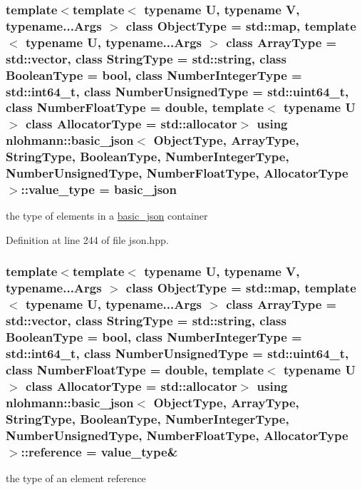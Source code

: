\subsubsection[{value\+\_\+type}]{\setlength{\rightskip}{0pt plus 5cm}template$<$template$<$ typename U, typename V, typename...\+Args $>$ class Object\+Type = std\+::map, template$<$ typename U, typename...\+Args $>$ class Array\+Type = std\+::vector, class String\+Type  = std\+::string, class Boolean\+Type  = bool, class Number\+Integer\+Type  = std\+::int64\+\_\+t, class Number\+Unsigned\+Type  = std\+::uint64\+\_\+t, class Number\+Float\+Type  = double, template$<$ typename U $>$ class Allocator\+Type = std\+::allocator$>$ using {\bf nlohmann\+::basic\+\_\+json}$<$ Object\+Type, Array\+Type, String\+Type, Boolean\+Type, Number\+Integer\+Type, Number\+Unsigned\+Type, Number\+Float\+Type, Allocator\+Type $>$\+::{\bf value\+\_\+type} =  {\bf basic\+\_\+json}}\label{classnlohmann_1_1basic__json_ac8d45b57874b4a6e9c07f7d3b5daa1f9}


the type of elements in a \hyperlink{classnlohmann_1_1basic__json}{basic\+\_\+json} container 



Definition at line 244 of file json.\+hpp.

\hypertarget{classnlohmann_1_1basic__json_a3ec8e17be8732fe436e9d6733f52b7a3}{}
\subsubsection[{reference}]{\setlength{\rightskip}{0pt plus 5cm}template$<$template$<$ typename U, typename V, typename...\+Args $>$ class Object\+Type = std\+::map, template$<$ typename U, typename...\+Args $>$ class Array\+Type = std\+::vector, class String\+Type  = std\+::string, class Boolean\+Type  = bool, class Number\+Integer\+Type  = std\+::int64\+\_\+t, class Number\+Unsigned\+Type  = std\+::uint64\+\_\+t, class Number\+Float\+Type  = double, template$<$ typename U $>$ class Allocator\+Type = std\+::allocator$>$ using {\bf nlohmann\+::basic\+\_\+json}$<$ Object\+Type, Array\+Type, String\+Type, Boolean\+Type, Number\+Integer\+Type, Number\+Unsigned\+Type, Number\+Float\+Type, Allocator\+Type $>$\+::{\bf reference} =  {\bf value\+\_\+type}\&}\label{classnlohmann_1_1basic__json_a3ec8e17be8732fe436e9d6733f52b7a3}


the type of an element reference 



